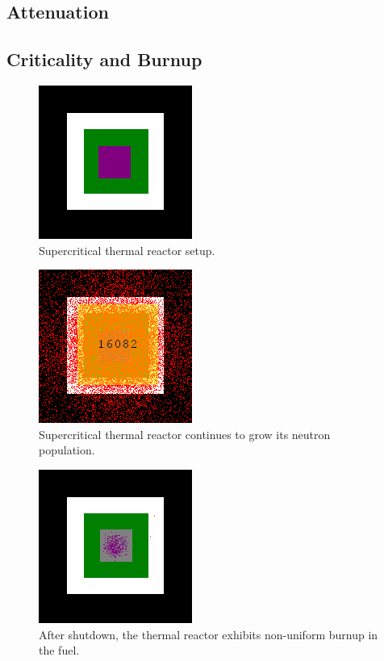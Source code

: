\documentclass{anstrans}
\begin{document}
\subsection{Attenuation}

\subsection{Criticality and Burnup}

\begin{figure}
    \centering
    \includegraphics{reactor-thermal-setup.png}
    \caption{Supercritical thermal reactor setup.}
    \label{fig:thermal-setup}
\end{figure}

\begin{figure}
    \centering
    \includegraphics{reactor-thermal-1min.png}
    \caption{Supercritical thermal reactor continues to grow its neutron population. }
    \label{fig:thermal-on}
\end{figure}

\begin{figure}
    \centering
    \includegraphics{reactor-thermal-after.png}
    \caption{After shutdown, the thermal reactor exhibits non-uniform burnup in the fuel. }
    \label{fig:thermal-after}
\end{figure}
\end{document}

